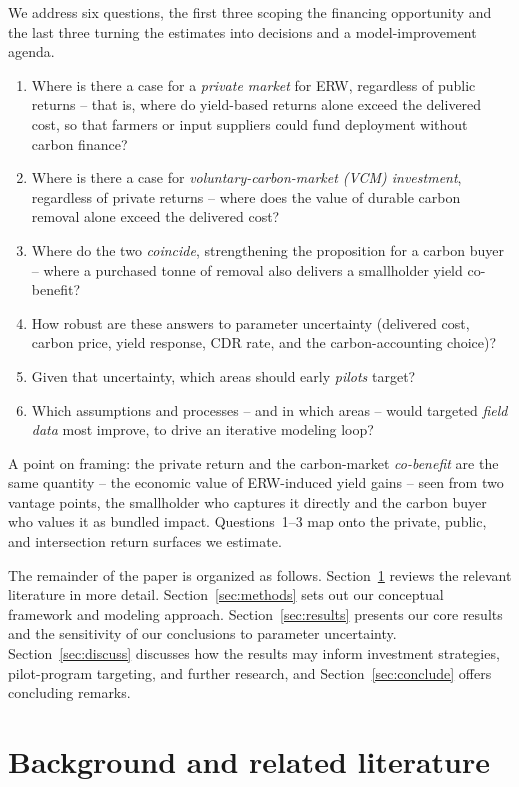 \documentclass[12pt]{article}
\begin{document}
We address six questions, the first three scoping the financing opportunity and
the last three turning the estimates into decisions and a model-improvement
agenda.
\begin{enumerate}
\item Where is there a case for a \emph{private market} for ERW, regardless of
  public returns -- that is, where do yield-based returns alone exceed the
  delivered cost, so that farmers or input suppliers could fund deployment
  without carbon finance?
\item Where is there a case for \emph{voluntary-carbon-market (VCM) investment},
  regardless of private returns -- where does the value of durable carbon removal
  alone exceed the delivered cost?
\item Where do the two \emph{coincide}, strengthening the proposition for a carbon
  buyer -- where a purchased tonne of removal also delivers a smallholder yield
  co-benefit?
\item How robust are these answers to parameter uncertainty (delivered cost,
  carbon price, yield response, CDR rate, and the carbon-accounting choice)?
\item Given that uncertainty, which areas should early \emph{pilots} target?
\item Which assumptions and processes -- and in which areas -- would targeted
  \emph{field data} most improve, to drive an iterative modeling loop?
\end{enumerate}
A point on framing: the private return and the carbon-market \emph{co-benefit}
are the same quantity -- the economic value of ERW-induced yield gains -- seen from
two vantage points, the smallholder who captures it directly and the carbon buyer
who values it as bundled impact. Questions~1--3 map onto the private, public, and
intersection return surfaces we estimate.

The remainder of the paper is organized as follows.
Section~\ref{sec:lit} reviews the relevant literature in more detail.
Section~\ref{sec:methods} sets out our conceptual framework and modeling
approach. Section~\ref{sec:results} presents our core results and the
sensitivity of our conclusions to parameter uncertainty.
Section~\ref{sec:discuss} discusses how the results may inform investment
strategies, pilot-program targeting, and further research, and
Section~\ref{sec:conclude} offers concluding remarks.

\section{Background and related literature}\label{sec:lit}
\end{document}
